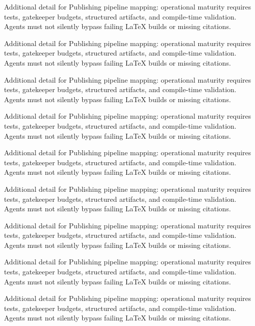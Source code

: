 Additional detail for Publishing pipeline mapping: operational maturity requires tests, gatekeeper budgets, structured artifacts, and compile-time validation. Agents must not silently bypass failing LaTeX builds or missing citations. \cite{crewai2024} \cite{langgraph2024}

Additional detail for Publishing pipeline mapping: operational maturity requires tests, gatekeeper budgets, structured artifacts, and compile-time validation. Agents must not silently bypass failing LaTeX builds or missing citations. \cite{crewai2024} \cite{langgraph2024}

Additional detail for Publishing pipeline mapping: operational maturity requires tests, gatekeeper budgets, structured artifacts, and compile-time validation. Agents must not silently bypass failing LaTeX builds or missing citations. \cite{crewai2024} \cite{langgraph2024}

Additional detail for Publishing pipeline mapping: operational maturity requires tests, gatekeeper budgets, structured artifacts, and compile-time validation. Agents must not silently bypass failing LaTeX builds or missing citations. \cite{crewai2024} \cite{langgraph2024}

Additional detail for Publishing pipeline mapping: operational maturity requires tests, gatekeeper budgets, structured artifacts, and compile-time validation. Agents must not silently bypass failing LaTeX builds or missing citations. \cite{crewai2024} \cite{langgraph2024}

Additional detail for Publishing pipeline mapping: operational maturity requires tests, gatekeeper budgets, structured artifacts, and compile-time validation. Agents must not silently bypass failing LaTeX builds or missing citations. \cite{crewai2024} \cite{langgraph2024}

Additional detail for Publishing pipeline mapping: operational maturity requires tests, gatekeeper budgets, structured artifacts, and compile-time validation. Agents must not silently bypass failing LaTeX builds or missing citations. \cite{crewai2024} \cite{langgraph2024}

Additional detail for Publishing pipeline mapping: operational maturity requires tests, gatekeeper budgets, structured artifacts, and compile-time validation. Agents must not silently bypass failing LaTeX builds or missing citations. \cite{crewai2024} \cite{langgraph2024}

Additional detail for Publishing pipeline mapping: operational maturity requires tests, gatekeeper budgets, structured artifacts, and compile-time validation. Agents must not silently bypass failing LaTeX builds or missing citations. \cite{crewai2024} \cite{langgraph2024}

